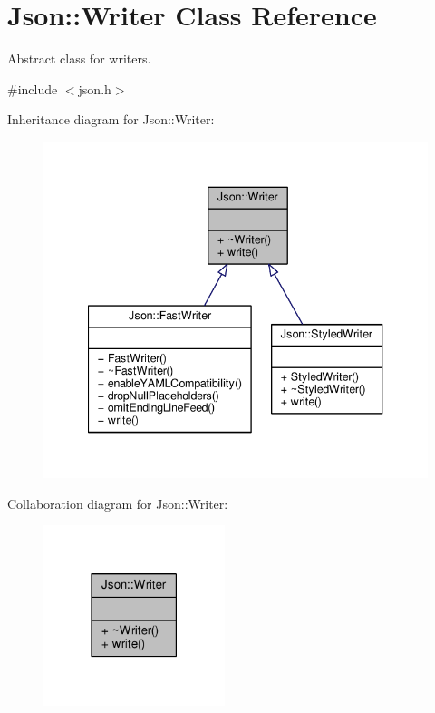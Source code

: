 \hypertarget{classJson_1_1Writer}{}\section{Json\+:\+:Writer Class Reference}
\label{classJson_1_1Writer}


Abstract class for writers.  




{\ttfamily \#include $<$json.\+h$>$}



Inheritance diagram for Json\+:\+:Writer\+:
\nopagebreak
\begin{figure}[H]
\begin{center}
\leavevmode
\includegraphics[width=340pt]{d8/de4/classJson_1_1Writer__inherit__graph}
\end{center}
\end{figure}


Collaboration diagram for Json\+:\+:Writer\+:
\nopagebreak
\begin{figure}[H]
\begin{center}
\leavevmode
\includegraphics[width=150pt]{d6/d60/classJson_1_1Writer__coll__graph}
\end{center}
\end{figure}
